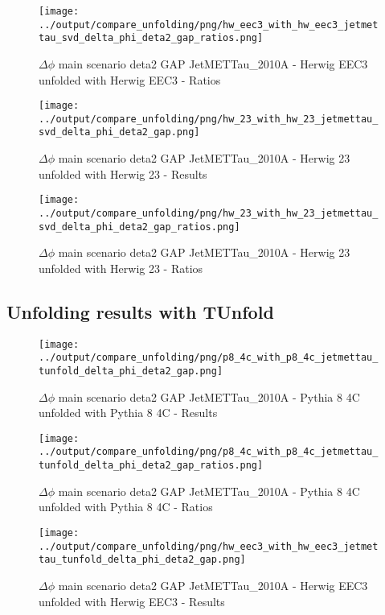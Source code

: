 \documentclass[11pt]{book}
\begin{document}
\begin{figure}[ht]
\centering
\texttt{[image: ../output/compare\_unfolding/png/hw\_eec3\_with\_hw\_eec3\_jetmettau\_svd\_delta\_phi\_deta2\_gap\_ratios.png]}
\caption{$\Delta\phi$ main scenario deta2 GAP JetMETTau\_2010A - Herwig EEC3 unfolded with Herwig EEC3 - Ratios}
\label{hw_eec3_hw_eec3_jetmettau_svd_delta_phi_deta2_gap_b}
\end{figure}

\begin{figure}[ht]
\centering
\texttt{[image: ../output/compare\_unfolding/png/hw\_23\_with\_hw\_23\_jetmettau\_svd\_delta\_phi\_deta2\_gap.png]}
\caption{$\Delta\phi$ main scenario deta2 GAP JetMETTau\_2010A - Herwig 23 unfolded with Herwig 23 - Results}
\label{hw_23_hw_23_jetmettau_svd_delta_phi_deta2_gap_a}
\end{figure}

\begin{figure}[ht]
\centering
\texttt{[image: ../output/compare\_unfolding/png/hw\_23\_with\_hw\_23\_jetmettau\_svd\_delta\_phi\_deta2\_gap\_ratios.png]}
\caption{$\Delta\phi$ main scenario deta2 GAP JetMETTau\_2010A - Herwig 23 unfolded with Herwig 23 - Ratios}
\label{hw_23_hw_23_jetmettau_svd_delta_phi_deta2_gap_b}
\end{figure}


\clearpage
\subsection{Unfolding results with TUnfold}

\begin{figure}[ht]
\centering
\texttt{[image: ../output/compare\_unfolding/png/p8\_4c\_with\_p8\_4c\_jetmettau\_tunfold\_delta\_phi\_deta2\_gap.png]}
\caption{$\Delta\phi$ main scenario deta2 GAP JetMETTau\_2010A - Pythia 8 4C unfolded with Pythia 8 4C - Results}
\label{p8_p8_jetmettau_tunfold_delta_phi_deta2_gap_a}
\end{figure}

\begin{figure}[ht]
\centering
\texttt{[image: ../output/compare\_unfolding/png/p8\_4c\_with\_p8\_4c\_jetmettau\_tunfold\_delta\_phi\_deta2\_gap\_ratios.png]}
\caption{$\Delta\phi$ main scenario deta2 GAP JetMETTau\_2010A - Pythia 8 4C unfolded with Pythia 8 4C - Ratios}
\label{p8_p8_jetmettau_tunfold_delta_phi_deta2_gap_b}
\end{figure}

\begin{figure}[ht]
\centering
\texttt{[image: ../output/compare\_unfolding/png/hw\_eec3\_with\_hw\_eec3\_jetmettau\_tunfold\_delta\_phi\_deta2\_gap.png]}
\caption{$\Delta\phi$ main scenario deta2 GAP JetMETTau\_2010A - Herwig EEC3 unfolded with Herwig EEC3 - Results}
\label{hw_eec3_hw_eec3_jetmettau_tunfold_delta_phi_deta2_gap_a}
\end{figure}
\end{document}

